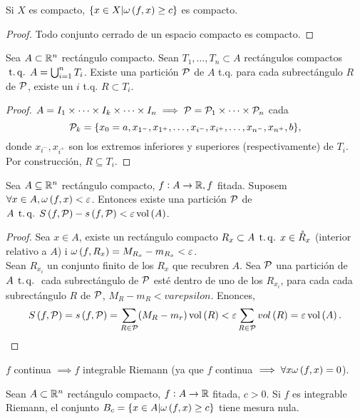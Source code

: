\begin{col*}
    Si $X$ es compacto, $\{x \in X | \omega \left( f, x \right) \geq c\}$ es compacto.
\end{col*}
\begin{proof}
    Todo conjunto cerrado de un espacio compacto es compacto.
\end{proof}
\begin{lema}\label{lema:teo_lebesgue}
    Sea $A \subset \mathbb{R}^n$ rectángulo compacto. Sean $T_1, \dots, T_n \subset A$ rectángulos compactos $\operatorname{\;t.q.\;} A = \bigcup_{i=1}^n T_i$. Existe una partición $\mathcal{P}$ de $A$ t.q. para cada subrectángulo $R$ de $\mathcal{P}$, existe un $i$ t.q. $R \subset T_i$.
\end{lema}
\begin{proof}
    $A = I_1 \times \dots \times I_k \times \dots \times I_n \implies \mathcal{P} = \mathcal{P}_1 \times \dots \times \mathcal{P}_n$ cada
    \[ \mathcal{P}_k = \{x_0 = a, x_{1^-}, x_{1^+}, \dots, x_{i^-}, x_{i^+}, \dots, x_{n^-}, x_{n^+}, b\}, \]
    donde $x_{i^-}, x_{i^+}$ son los extremos inferiores y superiores (respectivamente) de $T_i$. Por construcción, $R \subseteq T_i$.
\end{proof}
\begin{lema*}\label{lema:uno_lebesgue}
    Sea $A \subseteq \mathbb{R}^n$ rectángulo compacto, $f : A \to \mathbb{R}, f$ fitada. Suposem $\forall x  \in A, \omega \left( f, x \right) < \varepsilon$. Entonces existe una partición $\mathcal{P}$ de $A \operatorname{\;t.q.\;} S \left( f, \mathcal{P} \right) - s \left( f, \mathcal{P} \right) < \varepsilon \operatorname{vol} \left( A \right)$.
\end{lema*}
\begin{proof}
    Sea $x \in A$, existe un rectángulo compacto $R_x \subset A \operatorname{\;t.q.\;} x \in \mathring{R}_x$ (interior relativo a $A$) i $\omega \left( f, R_x \right) = M_{R_x} - m_{R_x} < \varepsilon$. \\
    Sean $R_{x_i}$ un conjunto finito de los $R_x$ que recubren $A$. Sea $\mathcal{P}$ una partición de $A \operatorname{\;t.q.\;}$ cada subrectángulo de $\mathcal{P}$ esté dentro de uno de los $R_{x_i}$, para cada cada subrectángulo $R$ de $\mathcal{P}$, $M_R - m_R < varepsilon$. Enonces,
    \[ S \left( f,\mathcal{P} \right) = s \left( f,\mathcal{P} \right) = \sum_{R \in \mathcal{P}} (M_R - m_r) \operatorname{vol} \left( R \right) < \varepsilon \sum_{R \in \mathcal{P}} vol \left( R \right) = \varepsilon \operatorname{vol} \left( A \right). \]
\end{proof}
\begin{col*}
    $f$ continua $\implies f$ integrable Riemann (ya que $f$ continua $\implies \forall x \omega \left( f, x \right) = 0$).
\end{col*}
\begin{lema*}[2]\label{lema:dos_lebesgue}
    Sean $A \subset \mathbb{R}^n$ rectángulo compacto, $f : A \to \mathbb{R}$ fitada, $c > 0$. Si $f$ es integrable Riemann, el conjunto $B_c = \{x \in A | \omega \left( f, x \right) \geq c\}$ tiene mesura nula.
\end{lema*}
